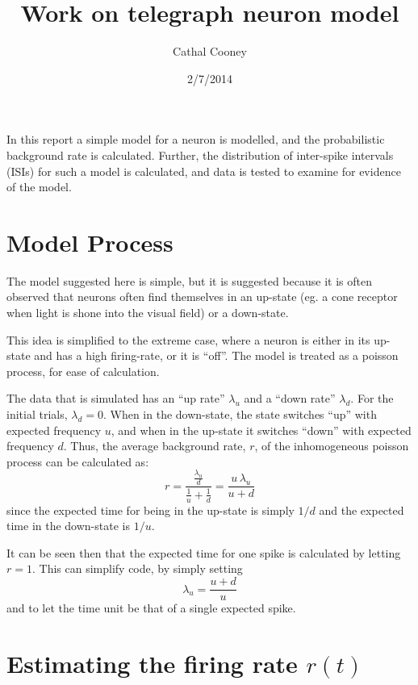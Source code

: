 \documentclass[11pt]{paper}
\begin{document}
\title{Work on telegraph neuron model}
\author{Cathal Cooney}
\date{2/7/2014}
\maketitle

In this report a simple model for a neuron is modelled, and the probabilistic background rate is calculated.  Further, the distribution of inter-spike intervals (ISIs) for such a model is calculated, and data is tested to examine for evidence of the model.

\section{Model Process}

The model suggested here is simple, but it is suggested because it is often observed that neurons often find themselves in an up-state (eg. a cone receptor when light is shone into the visual field) or a down-state.

This idea is simplified to the extreme case, where a neuron is either in its up-state and has a high firing-rate, or it is ``off''.   The model is treated as a poisson process, for ease of calculation.

The data that is simulated has an ``up rate'' $\lambda_u$ and a ``down rate'' $\lambda_d$.  For the initial trials, $\lambda_d = 0$.  When in the down-state, the state switches ``up'' with expected frequency $u$, and when in the up-state it switches ``down'' with expected frequency $d$.  Thus, the average background rate, $r$, of the inhomogeneous poisson process can be calculated as:
\begin{equation}\label{lam}
r = \frac{ \frac{\lambda_u }{d}}{ \frac{1}{u} + \frac{1}{d}} = \frac{u\, \lambda_u}{u+d}
\end{equation}
since the expected time for being in the up-state is simply $1/d$ and the expected time in the down-state is $1/u$.

It can be seen then that the expected time for one spike is calculated by letting $r=1$.  This can simplify code, by simply setting 
\begin{equation}
\lambda_u= \frac{u+d}{u}
\end{equation}
and to let the time unit be that of a single expected spike.

\section{Estimating the firing rate $r(t)$}
\end{document}
